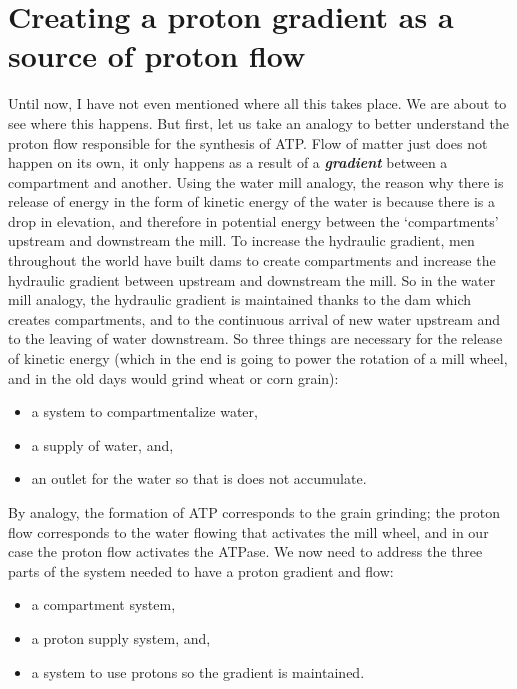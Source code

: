 \documentclass[]{book}
\providecommand{\tightlist}{%
  \setlength{\itemsep}{0pt}\setlength{\parskip}{0pt}}
\theoremstyle{definition}
\theoremstyle{definition}
\theoremstyle{definition}
\theoremstyle{remark}
\begin{document}
\section{Creating a proton gradient as a source of proton
flow}\label{creating-a-proton-gradient-as-a-source-of-proton-flow}

Until now, I have not even mentioned where all this takes place. We are
about to see where this happens. But first, let us take an analogy to
better understand the proton flow responsible for the synthesis of ATP.
Flow of matter just does not happen on its own, it only happens as a
result of a \emph{\textbf{gradient}} between a compartment and another.
Using the water mill analogy, the reason why there is release of energy
in the form of kinetic energy of the water is because there is a drop in
elevation, and therefore in potential energy between the `compartments'
upstream and downstream the mill. To increase the hydraulic gradient,
men throughout the world have built dams to create compartments and
increase the hydraulic gradient between upstream and downstream the
mill. So in the water mill analogy, the hydraulic gradient is maintained
thanks to the dam which creates compartments, and to the continuous
arrival of new water upstream and to the leaving of water downstream. So
three things are necessary for the release of kinetic energy (which in
the end is going to power the rotation of a mill wheel, and in the old
days would grind wheat or corn grain):

\begin{itemize}
\tightlist
\item
  a system to compartmentalize water,
\item
  a supply of water, and,
\item
  an outlet for the water so that is does not accumulate.
\end{itemize}

By analogy, the formation of ATP corresponds to the grain grinding; the
proton flow corresponds to the water flowing that activates the mill
wheel, and in our case the proton flow activates the ATPase. We now need
to address the three parts of the system needed to have a proton
gradient and flow:

\begin{itemize}
\tightlist
\item
  a compartment system,
\item
  a proton supply system, and,
\item
  a system to use protons so the gradient is maintained.
\end{itemize}
\end{document}
